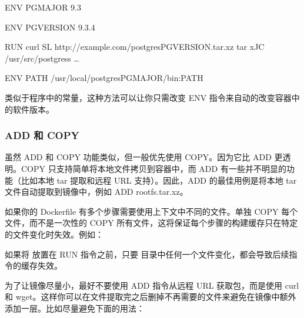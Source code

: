 \documentclass[letterpaper,10pt,english]{sphinxmanual}
\begin{document}
\begin{sphinxVerbatim}[commandchars=\\\{\}]
ENV PG\PYGZus{}MAJOR 9.3

ENV PG\PYGZus{}VERSION 9.3.4

RUN curl \PYGZhy{}SL http://example.com/postgres\PYGZhy{}\PYGZdl{}PG\PYGZus{}VERSION.tar.xz \textbar{} tar \PYGZhy{}xJC /usr/src/postgress \PYGZam{}\PYGZam{} …

ENV PATH /usr/local/postgres\PYGZhy{}\PYGZdl{}PG\PYGZus{}MAJOR/bin:\PYGZdl{}PATH
\end{sphinxVerbatim}

类似于程序中的常量，这种方法可以让你只需改变 ENV 指令来自动的改变容器中的软件版本。


\subsubsection{ADD 和 COPY}
\label{\detokenize{docker/appendix:add-copy}}
虽然 ADD 和 COPY 功能类似，但一般优先使用 COPY。因为它比 ADD 更透明。COPY 只支持简单将本地文件拷贝到容器中，而 ADD 有一些并不明显的功能（比如本地 tar 提取和远程 URL 支持）。因此，ADD 的最佳用例是将本地 tar 文件自动提取到镜像中，例如 ADD rootfs.tar.xz。

如果你的 Dockerfile 有多个步骤需要使用上下文中不同的文件。单独 COPY 每个文件，而不是一次性的 COPY 所有文件，这将保证每个步骤的构建缓存只在特定的文件变化时失效。例如：

\begin{sphinxVerbatim}[commandchars=\\\{\}]
  

    

  
\end{sphinxVerbatim}

如果将  放置在 RUN 指令之前，只要  目录中任何一个文件变化，都会导致后续指令的缓存失效。

为了让镜像尽量小，最好不要使用 ADD 指令从远程 URL 获取包，而是使用 curl 和 wget。这样你可以在文件提取完之后删掉不再需要的文件来避免在镜像中额外添加一层。比如尽量避免下面的用法：
\end{document}
